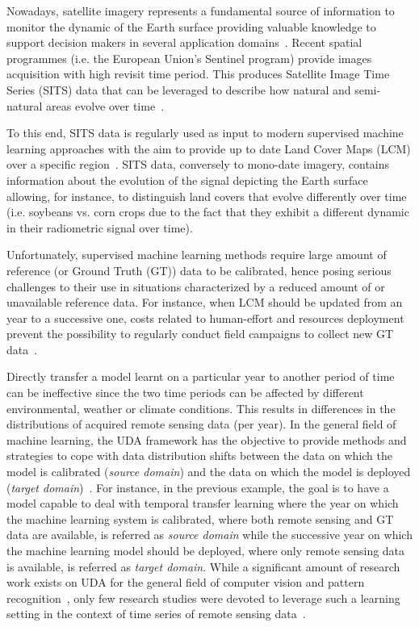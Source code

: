 Nowadays, satellite imagery represents a fundamental source of information to monitor the dynamic of the Earth surface providing valuable knowledge to support decision makers in several application domains~\cite{TOTH201622}. Recent spatial programmes (i.e. the European Union's Sentinel program) provide images acquisition with high revisit time period. This produces Satellite Image Time Series (SITS) data that can be leveraged to describe how natural and semi-natural areas evolve over time~\cite{GOMEZ201655}. 

To this end, SITS data is regularly used as input to modern supervised machine learning approaches with the aim to provide up to date Land Cover Maps (LCM) over a specific region~\cite{GOMEZ201655}. SITS data, conversely to mono-date imagery, contains information about the evolution of the signal depicting the Earth surface allowing, for instance, to distinguish land covers that evolve differently over time (i.e. soybeans vs. corn crops due to the fact that they exhibit a different dynamic in their radiometric signal over time).

Unfortunately, supervised machine learning methods require large amount of reference (or Ground Truth (GT)) data to be calibrated, hence posing serious challenges to their use in situations characterized by a reduced amount of or unavailable reference data. For instance, when LCM should be updated from an year to a successive one, costs related to human-effort and resources deployment prevent the possibility to regularly conduct field campaigns to collect new GT data~\cite{Tardy17}.

Directly transfer a model learnt on a particular year to another period of time can be ineffective since the two time periods can be affected by different environmental, weather or climate conditions. This results in differences in the distributions of acquired remote sensing data (per year).  In the general field of machine learning, the UDA framework has the objective to provide methods and strategies to cope with data distribution shifts between the data on which the model is calibrated (\textit{source domain}) and the data on which the model is deployed (\textit{target domain})~\cite{Kouw21}. For instance, in the previous example, the goal is to have a model capable to deal with temporal transfer learning where the year on which the machine learning system is calibrated, where both remote sensing and GT data are available, is referred as \textit{source domain} while the successive year on which the machine learning model should be deployed, where only remote sensing data is available, is referred as \textit{target domain}.
While a significant amount of research work exists on UDA for the general field of computer vision and pattern recognition~\cite{Kouw21}, only few research studies were devoted to leverage such a learning setting in the context of time series of remote sensing data~\cite{Pelletier19}.


